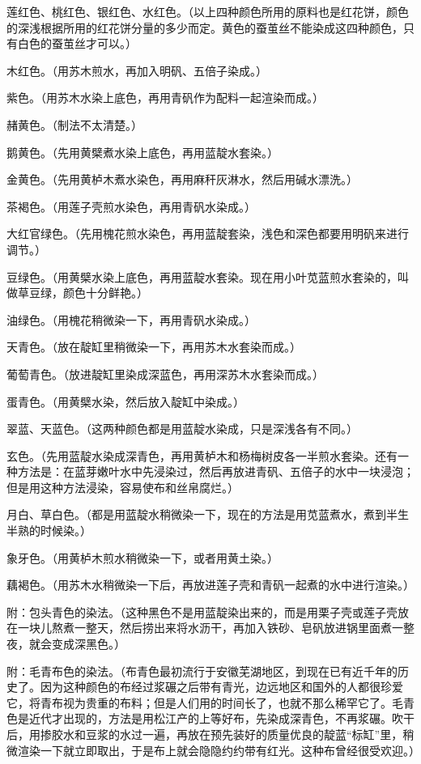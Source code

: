 \documentclass[12pt,UTF8]{ctexbook}
\begin{document}
莲红色、桃红色、银红色、水红色。（以上四种颜色所用的原料也是红花饼，颜色的深浅根据所用的红花饼分量的多少而定。黄色的蚕茧丝不能染成这四种颜色，只有白色的蚕茧丝才可以。）

木红色。（用苏木煎水，再加入明矾、五倍子染成。）

紫色。（用苏木水染上底色，再用青矾作为配料一起渲染而成。）

赭黄色。（制法不太清楚。）

鹅黄色。（先用黄檗煮水染上底色，再用蓝靛水套染。）

金黄色。（先用黄栌木煮水染色，再用麻秆灰淋水，然后用碱水漂洗。）

茶褐色。（用莲子壳煎水染色，再用青矾水染成。）

大红官绿色。（先用槐花煎水染色，再用蓝靛套染，浅色和深色都要用明矾来进行调节。）

豆绿色。（用黄檗水染上底色，再用蓝靛水套染。现在用小叶苋蓝煎水套染的，叫做草豆绿，颜色十分鲜艳。）

油绿色。（用槐花稍微染一下，再用青矾水染成。）

天青色。（放在靛缸里稍微染一下，再用苏木水套染而成。）

葡萄青色。（放进靛缸里染成深蓝色，再用深苏木水套染而成。）

蛋青色。（用黄檗水染，然后放入靛缸中染成。）

翠蓝、天蓝色。（这两种颜色都是用蓝靛水染成，只是深浅各有不同。）

玄色。（先用蓝靛水染成深青色，再用黄栌木和杨梅树皮各一半煎水套染。还有一种方法是：在蓝芽嫩叶水中先浸染过，然后再放进青矾、五倍子的水中一块浸泡；但是用这种方法浸染，容易使布和丝帛腐烂。）

月白、草白色。（都是用蓝靛水稍微染一下，现在的方法是用苋蓝煮水，煮到半生半熟的时候染。）

象牙色。（用黄栌木煎水稍微染一下，或者用黄土染。）

藕褐色。（用苏木水稍微染一下后，再放进莲子壳和青矾一起煮的水中进行渲染。）

附：包头青色的染法。（这种黑色不是用蓝靛染出来的，而是用栗子壳或莲子壳放在一块儿熬煮一整天，然后捞出来将水沥干，再加入铁砂、皂矾放进锅里面煮一整夜，就会变成深黑色。）

附：毛青布色的染法。（布青色最初流行于安徽芜湖地区，到现在已有近千年的历史了。因为这种颜色的布经过浆碾之后带有青光，边远地区和国外的人都很珍爱它，将青布视为贵重的布料；但是人们用的时间长了，也就不那么稀罕它了。毛青色是近代才出现的，方法是用松江产的上等好布，先染成深青色，不再浆碾。吹干后，用掺胶水和豆浆的水过一遍，再放在预先装好的质量优良的靛蓝“标缸”里，稍微渲染一下就立即取出，于是布上就会隐隐约约带有红光。这种布曾经很受欢迎。）
\end{document}

